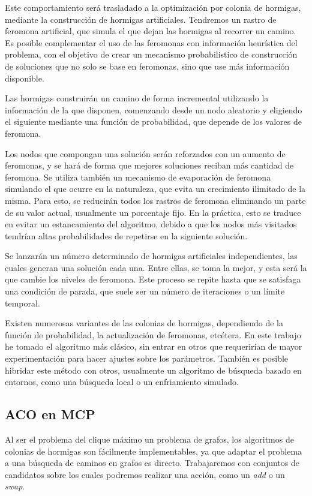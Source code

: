 Este comportamiento será trasladado a la optimización por colonia de hormigas,
mediante la construcción de hormigas artificiales. Tendremos un rastro de feromona
artificial, que simula el que dejan las hormigas al recorrer un camino. Es posible
complementar el uso de las feromonas con información heurística del problema,
con el objetivo de crear un mecanismo probabilistico de construcción de soluciones
que no solo se base en feromonas, sino que use más información disponible.

Las hormigas construirán un camino de forma incremental utilizando la información
de la que disponen, comenzando desde un nodo aleatorio y eligiendo el siguiente
mediante una función de probabilidad, que depende de los valores de feromona.

Los nodos que compongan una solución serán reforzados con un aumento de feromonas, y
se hará de forma que mejores soluciones reciban más cantidad de feromona.
Se utiliza también un mecanismo de evaporación de feromona simulando el que ocurre en
la naturaleza, que evita un crecimiento ilimitado de la misma. Para esto, se reducirán
todos los rastros de feromona eliminando un parte de su valor actual, usualmente un
porcentaje fijo. En la práctica, esto se traduce en evitar un estancamiento del algoritmo,
debido a que los nodos más visitados tendrían altas probabilidades de repetirse en la
siguiente solución.

Se lanzarán un número determinado de hormigas artificiales independientes, las
cuales generan una solución cada una. Entre ellas, se toma la mejor, y esta será la
que cambie los niveles de feromona. Este proceso se repite hasta que se satisfaga una
condición de parada, que suele ser un número de iteraciones o un límite temporal.

Existen numerosas variantes de las colonias de hormigas, dependiendo de la función de
probabilidad, la actualización de feromonas, etcétera. En este trabajo he tomado el
algoritmo más clásico, sin entrar en otros que requerirían de mayor experimentación
para hacer ajustes sobre los parámetros. También es posible hibridar este método
con otros, usualmente un algoritmo de búsqueda basado en entornos, como una búsqueda
local o un enfriamiento simulado.

\subsection{ACO en MCP}

Al ser el problema del clique máximo un problema de grafos, los algoritmos de colonias
de hormigas son fácilmente implementables, ya que adaptar el problema a una búsqueda
de caminos en grafos es directo. Trabajaremos con conjuntos de candidatos sobre los
cuales podremos realizar una acción, como un \textit{add} o un \textit{swap}.

